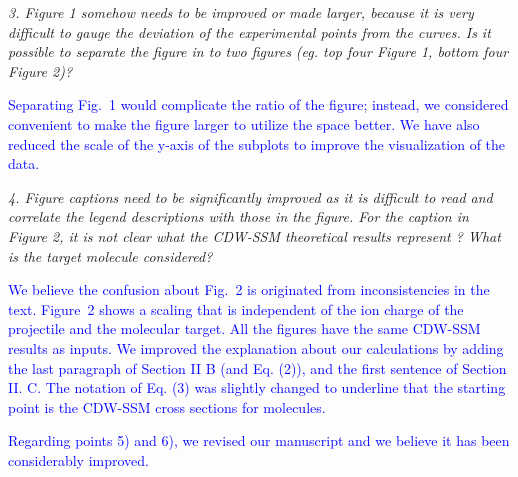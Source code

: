 \documentclass[a4paper,12pt]{article}
\def\reviewer#1{\vspace{0.35cm}\textsl{#1}}
\def\reply#1{\vspace{0.1cm}\textcolor{blue}{#1}}
\begin{document}
\reviewer{3. Figure 1 somehow needs to be improved or made larger,
because it is very difficult to gauge the deviation of the experimental
points from the curves. Is it possible to separate the figure in to two
figures (eg. top four Figure 1, bottom four Figure 2)?}

\reply{Separating Fig.~1 would complicate the ratio of the figure; 
instead, we considered convenient to make the figure larger to utilize 
the space better. We have also reduced the scale of the y-axis of the 
subplots to improve the visualization of the data.}

\reviewer{4. Figure captions need to be significantly improved as it is
difficult to read and correlate the legend descriptions with those in
the figure. For the caption in Figure 2, it is not clear what the
CDW-SSM theoretical results represent ? What is the target molecule
considered?}

\reply{We believe the confusion about Fig.~2 is originated from 
inconsistencies in the text. Figure~2 shows a scaling that is 
independent of the ion charge of the projectile and the molecular 
target. All the figures have the same CDW-SSM results as inputs. We 
improved the explanation about our calculations by adding the last 
paragraph of Section II B (and Eq. (2)), and the first sentence of 
Section II. C. The notation of Eq. (3) was slightly changed to underline 
that the starting point is the CDW-SSM cross sections for molecules.}



\vspace{0.5cm}
\reply{Regarding points 5) and 6), we revised our manuscript and we 
believe it has been considerably improved.}
\end{document}
